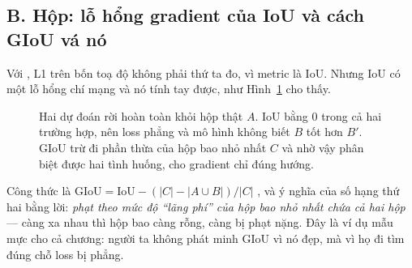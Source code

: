 \documentclass[../../deep_learning.tex]{subfiles}
\begin{document}
\subsection{B. Hộp: lỗ hổng gradient của IoU và cách GIoU vá nó}

Với , L1 trên bốn toạ độ không phải thứ ta đo, vì metric là IoU. Nhưng IoU có một lỗ hổng chí mạng và nó tính tay được, như Hình~\ref{fig:giou} cho thấy.

\begin{figure}[H]\centering
{}
\caption{Hai dự đoán rời hoàn toàn khỏi hộp thật \(A\). IoU bằng 0 trong cả hai trường hợp, nên loss phẳng và mô hình không biết \(B\) tốt hơn \(B'\). GIoU trừ đi phần thừa của hộp bao nhỏ nhất \(C\) và nhờ vậy phân biệt được hai tình huống, cho gradient chỉ đúng hướng.}
\label{fig:giou}
\end{figure}

Công thức là \(\mathrm{GIoU} = \mathrm{IoU} - (|C| - |A\cup B|)/|C|\) \cite{rezatofighi2019giou}, và ý nghĩa của số hạng thứ hai bằng lời: \emph{phạt theo mức độ ``lãng phí'' của hộp bao nhỏ nhất chứa cả hai hộp} --- càng xa nhau thì hộp bao càng rỗng, càng bị phạt nặng. Đây là ví dụ mẫu mực cho cả chương: người ta không phát minh GIoU vì nó đẹp, mà vì họ đi tìm đúng chỗ loss bị phẳng.
\end{document}
